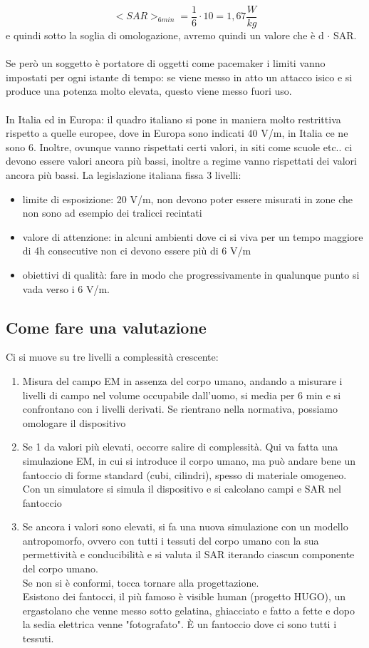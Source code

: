 \documentclass[oneside, 12pt]{extbook}
\begin{document}
\begin{equation}
	<SAR>_{6 min} = \frac{1}{6} \cdot 10 = 1,67 \frac{W}{kg}
\end{equation}
e quindi sotto la soglia di omologazione, avremo quindi un valore che è d $\cdot$ SAR.\\\\Se però un soggetto è portatore di oggetti come pacemaker i limiti vanno impostati per ogni istante di tempo: se viene messo in atto un attacco isico e si produce una potenza molto elevata, questo viene messo fuori uso.\\\\In Italia ed in Europa: il quadro italiano si pone in maniera molto restrittiva rispetto a quelle europee, dove in Europa sono indicati 40 V/m, in Italia ce ne sono 6. Inoltre, ovunque vanno rispettati certi valori, in siti come scuole etc.. ci devono essere valori ancora più bassi, inoltre a regime vanno rispettati dei valori ancora più bassi. La legislazione italiana fissa 3 livelli:
\begin{itemize}
	\item limite di esposizione: 20 V/m, non devono poter essere misurati in zone che non sono ad esempio dei tralicci recintati
	\item valore di attenzione: in alcuni ambienti dove ci si viva per un tempo maggiore di 4h consecutive non ci devono essere più di 6 V/m
	\item obiettivi di qualità: fare in modo che progressivamente in qualunque punto si vada verso i 6 V/m.
\end{itemize}
\subsection{Come fare una valutazione}
Ci si muove su tre livelli a complessità crescente:
\begin{enumerate}
	\item Misura del campo EM in assenza del corpo umano, andando a misurare i livelli di campo nel volume occupabile dall'uomo, si media per 6 min e si confrontano con i livelli derivati. Se rientrano nella normativa, possiamo omologare il dispositivo
	\item Se 1 da valori più elevati, occorre salire di complessità. Qui va fatta una simulazione EM, in cui si introduce il corpo umano, ma può andare bene un fantoccio di forme standard (cubi, cilindri), spesso di materiale omogeneo.\\Con un simulatore si simula il dispositivo e si calcolano campi e SAR nel fantoccio
	\item Se ancora i valori sono elevati, si fa una nuova simulazione con un modello antropomorfo, ovvero con tutti i tessuti del corpo umano con la sua permettività e conducibilità  e si valuta il SAR iterando ciascun componente del corpo umano.\\Se non si è conformi, tocca tornare alla progettazione.\\Esistono dei fantocci, il più famoso è visible human (progetto HUGO), un ergastolano che venne messo sotto gelatina, ghiacciato e fatto a fette e dopo la sedia elettrica venne "fotografato". È un fantoccio dove ci sono tutti i tessuti.
\end{enumerate}
\end{document}
